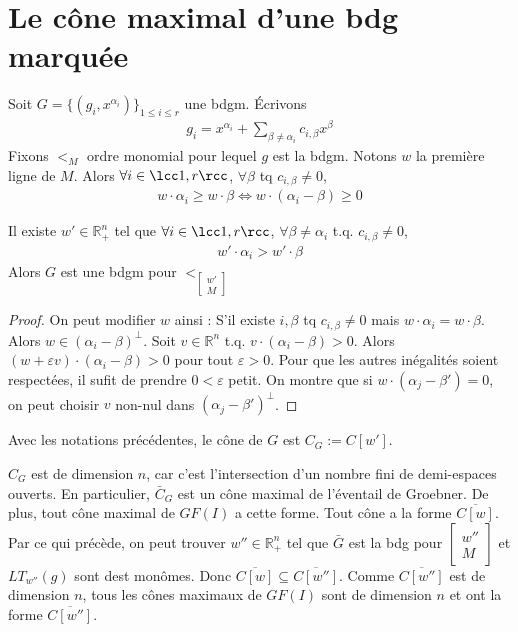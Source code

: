         \section{Le cône maximal d'une bdg marquée}
            Soit $G = \{(g_i, x^{\alpha_i})\}_{1 \leq i \leq r}$ une bdgm. Écrivons
            \begin{align*}
                g_i = x^{\alpha_i} + \sum_{\beta \neq \alpha_i} c_{i, \beta} x^\beta
            \end{align*}
            Fixons $<_M$ ordre monomial pour lequel $g$ est la bdgm. Notons $w$ la première ligne de $M$. Alors $\forall i \in \lcc 1,r \rcc$, $\forall \beta$ tq $c_{i, \beta} \neq 0$,
            \begin{align*}
                w \cdot \alpha_i \geq  w \cdot \beta \iff w \cdot (\alpha_i - \beta) \geq 0
            \end{align*}
            \begin{lemm}
                Il existe $w' \in \mathbb{R}^n_+$ tel que $\forall i \in \lcc 1,r \rcc$, $\forall \beta \neq \alpha_i$ t.q. $c_{i, \beta} \neq 0$,
                \begin{align*}
                    w' \cdot \alpha_i > w' \cdot \beta
                \end{align*}
                Alors $G$ est une bdgm pour $<_{\begin{bmatrix} w' \\ M \end{bmatrix}}$
            \end{lemm}
            \begin{proof}
                On peut modifier $w$ ainsi : S'il existe $i, \beta$ tq $c_{i, \beta} \neq 0$ mais $w \cdot \alpha_i = w \cdot \beta$. Alors $w \in (\alpha_i - \beta)^\bot$. Soit $v \in \mathbb{R}^n$ t.q. $v \cdot (\alpha_i - \beta) > 0$. Alors $(w + \varepsilon v) \cdot (\alpha_i - \beta) > 0$ pour tout $\varepsilon > 0$. Pour que les autres inégalités soient respectées, il sufit de prendre $0 < \varepsilon$ petit. On montre que si $w \cdot (\alpha_j - \beta') = 0$, on peut choisir $v$ non-nul dans $(\alpha_j - \beta')^\bot$.
            \end{proof}
            \begin{defi}
                Avec les notations précédentes, le cône de $G$ est $C_G := C[w']$.
            \end{defi}
            \begin{remq}
                $C_G$ est de dimension $n$, car c'est l'intersection d'un nombre fini de demi-espaces ouverts. En particulier, $\bar C_G$ est un cône maximal de l'éventail de Groebner. De plus, tout cône maximal de $GF(I)$ a cette forme. Tout cône a la forme $\overline{C[w]}$. Par ce qui précède, on peut trouver $w'' \in \mathbb{R}^n_+$ tel que $\bar G$ est la bdg pour $\begin{bmatrix} w'' \\ M \end{bmatrix}$ et $LT_{w''}(g)$ sont dest monômes. Donc $\overline{C[w]} \subseteq \overline{C[w'']}$. Comme $\overline{C[w'']}$ est de dimension $n$, tous les cônes maximaux de $GF(I)$ sont de dimension $n$ et ont la forme $\overline{C[w'']}$.
            \end{remq}
